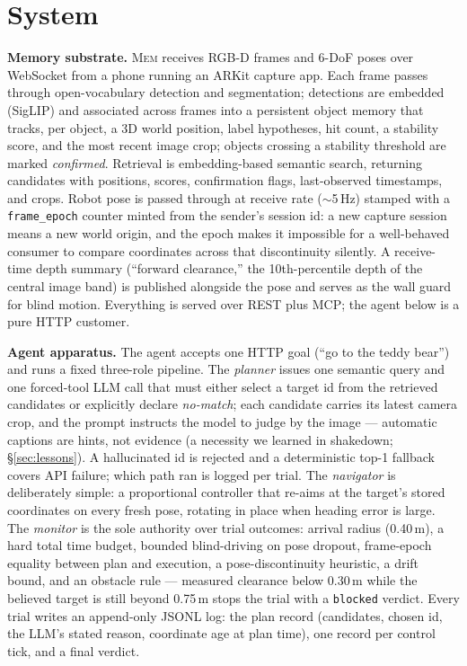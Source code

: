 \documentclass{article}
\newcommand{\rtsm}{\textsc{Mem}} %
\begin{document}
\section{System}

\textbf{Memory substrate.} \rtsm{} receives RGB-D frames and 6-DoF
poses over WebSocket from a phone running an ARKit capture app. Each
frame passes through open-vocabulary detection and segmentation;
detections are embedded (SigLIP) and associated across frames into a
persistent object memory that tracks, per object, a 3D world position,
label hypotheses, hit count, a stability score, and the most recent
image crop; objects crossing a stability threshold are marked
\emph{confirmed}. Retrieval is embedding-based semantic search,
returning candidates with positions, scores, confirmation flags,
last-observed timestamps, and crops. Robot pose is passed through at
receive rate ($\sim$5\,Hz) stamped with a \texttt{frame\_epoch} counter
minted from the sender's session id: a new capture session means a new
world origin, and the epoch makes it impossible for a well-behaved
consumer to compare coordinates across that discontinuity silently. A
receive-time depth summary (``forward clearance,'' the 10th-percentile
depth of the central image band) is published alongside the pose and
serves as the wall guard for blind motion. Everything is served over
REST plus MCP; the agent below is a pure HTTP customer.

\textbf{Agent apparatus.} The agent accepts one HTTP goal (``go to the
teddy bear'') and runs a fixed three-role pipeline. The \emph{planner}
issues one semantic query and one forced-tool LLM call that must either
select a target id from the retrieved candidates or explicitly declare
\emph{no-match}; each candidate carries its latest camera crop, and the
prompt instructs the model to judge by the image --- automatic captions
are hints, not evidence (a necessity we learned in shakedown; \S\ref{sec:lessons}).
A hallucinated id is rejected and a deterministic top-1 fallback covers
API failure; which path ran is logged per trial. The \emph{navigator}
is deliberately simple: a proportional controller that re-aims at the
target's stored coordinates on every fresh pose, rotating in place when
heading error is large. The \emph{monitor} is the sole authority over
trial outcomes: arrival radius (0.40\,m), a hard total time budget,
bounded blind-driving on pose dropout, frame-epoch equality between
plan and execution, a pose-discontinuity heuristic, a drift bound, and
an obstacle rule --- measured clearance below 0.30\,m while the
believed target is still beyond 0.75\,m stops the trial with a
\texttt{blocked} verdict. Every trial writes an append-only JSONL log:
the plan record (candidates, chosen id, the LLM's stated reason,
coordinate age at plan time), one record per control tick, and a final
verdict.
\end{document}
